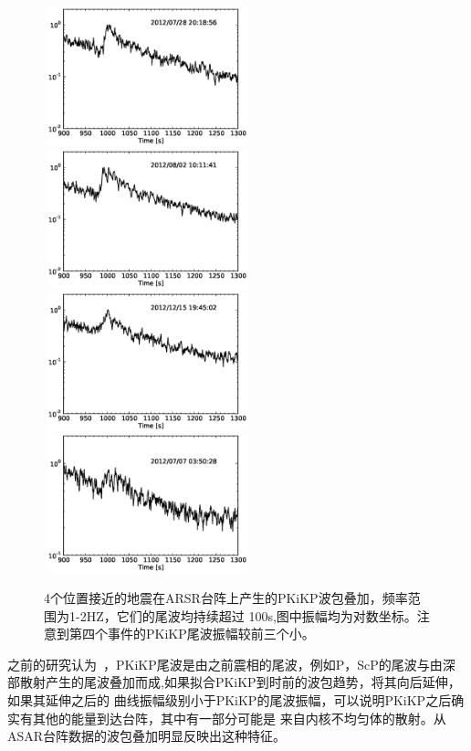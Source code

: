 \begin{figure}[tbph]
	\centering
	\includegraphics[width=6cm,height=4cm]{fig/chap3/3344573_coda.eps}
	\hspace{2em}
	\includegraphics[width=6cm,height=4cm]{fig/chap3/3347700_coda.eps}\\
	\includegraphics[width=6cm,height=4cm]{fig/chap3/3712078_coda.eps}
	\hspace{2em}
	\includegraphics[width=6cm,height=4cm]{fig/chap3/3343509_coda.eps}
	\caption{4个位置接近的地震在ARSR台阵上产生的PKiKP波包叠加，频率范围为1-2HZ，它们的尾波均持续超过%
100s,图中振幅均为对数坐标。注意到第四个事件的PKiKP尾波振幅较前三个小。}
\end{figure}

之前的研究认为~\citep{Koper2004,Poupinet2004}，PKiKP尾波是由之前震相的尾波，例如P，ScP的尾波与由深部散射产生的尾波叠加而成,如果拟合PKiKP到时前的波包趋势，将其向后延伸，如果其延伸之后的
曲线振幅级别小于PKiKP的尾波振幅，可以说明PKiKP之后确实有其他的能量到达台阵，其中有一部分可能是
来自内核不均匀体的散射。从ASAR台阵数据的波包叠加明显反映出这种特征。

